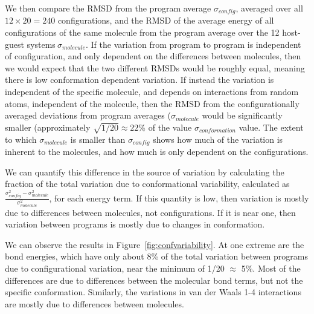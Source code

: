 We then compare the RMSD from the program average $\sigma_{config}$,
averaged over all $12 \times 20 = 240$ configurations, and the RMSD of
the average energy of all configurations of the same molecule from the
program average over the 12 host-guest systems$~\sigma_{molecule}$. If
the variation from program to program is independent of configuration,
and only dependent on the differences between molecules, then we would
expect that the two different RMSDs would be roughly equal, meaning
there is low conformation dependent variation.  If instead the
variation is independent of the specific molecule, and depends on
interactions from random atoms, independent of the molecule, then the
RMSD from the configurationally averaged deviations from program
averages ($\sigma_{molecule}$ would be significantly smaller
(approximately $\sqrt{1/20} \approx 22$\% of the value
$\sigma_{conformation}$ value.
The extent to which $\sigma_{molecule}$ is smaller than
$\sigma_{config}$ shows how much of the variation is inherent to the
molecules, and how much is only dependent on the configurations.

We can quantify this difference in the source of variation by
calculating the fraction of the total variation due to conformational
variability, calculated as
$\frac{\sigma^2_{config}-\sigma^2_{molecule}}{\sigma^2_{molecule}}$,
for each energy term. If this quantity is low, then variation is
mostly due to differences between molecules, not configurations.  If
it is near one, then variation between programs is mostly due to
changes in conformation.

We can observe the results in Figure~\ref{fig:confvariability}. At one
extreme are the bond energies, which have only about 8\% of the total
variation between programs due to configurational variation, near the
minimum of 1/20 $\approx$ 5\%. Most of the differences are due to
differences between the molecular bond terms, but not the specific
conformation.  Similarly, the variations in van der Waals 1-4
interactions are mostly due to differences between molecules.

